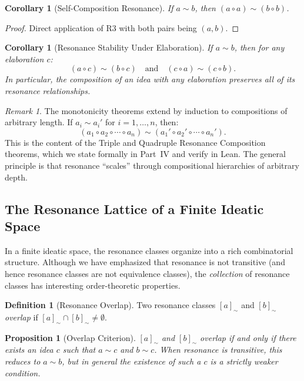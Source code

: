 \documentclass[11pt,openany]{book}
\theoremstyle{definition}
\newtheorem{definition}[axiom]{Definition}
\theoremstyle{plain}
\newtheorem{proposition}[axiom]{Proposition}
\newtheorem{corollary}[axiom]{Corollary}
\theoremstyle{remark}
\newtheorem{remark}[axiom]{Remark}
\newcommand{\compose}{\circ}                 %
\newcommand{\res}{\sim}                      %
\begin{document}
\begin{corollary}[Self-Composition Resonance]
If $a \res b$, then $(a \compose a) \res (b \compose b)$.
\end{corollary}

\begin{proof}
Direct application of R3 with both pairs being $(a, b)$.
\end{proof}

\begin{corollary}[Resonance Stability Under Elaboration]
If $a \res b$, then for any elaboration $c$:
\[
(a \compose c) \res (b \compose c) \quad \text{and} \quad (c \compose a) \res (c \compose b).
\]
In particular, the composition of an idea with any elaboration preserves all of its resonance relationships.
\end{corollary}

\begin{remark}
The monotonicity theorems extend by induction to compositions of arbitrary length. If $a_i \res a_i'$ for $i = 1, \ldots, n$, then:
\[
(a_1 \compose a_2 \compose \cdots \compose a_n) \res (a_1' \compose a_2' \compose \cdots \compose a_n').
\]
This is the content of the Triple and Quadruple Resonance Composition theorems, which we state formally in Part~IV and verify in Lean. The general principle is that resonance ``scales'' through compositional hierarchies of arbitrary depth.
\end{remark}

\subsection{The Resonance Lattice of a Finite Ideatic Space}

In a finite ideatic space, the resonance classes organize into a rich combinatorial structure. Although we have emphasized that resonance is not transitive (and hence resonance classes are not equivalence classes), the \emph{collection} of resonance classes has interesting order-theoretic properties.

\begin{definition}[Resonance Overlap]
Two resonance classes $[a]_\res$ and $[b]_\res$ \emph{overlap} if $[a]_\res \cap [b]_\res \neq \emptyset$.
\end{definition}

\begin{proposition}[Overlap Criterion]
$[a]_\res$ and $[b]_\res$ overlap if and only if there exists an idea $c$ such that $a \res c$ and $b \res c$. When resonance is transitive, this reduces to $a \res b$, but in general the existence of such a $c$ is a strictly weaker condition.
\end{proposition}
\end{document}
